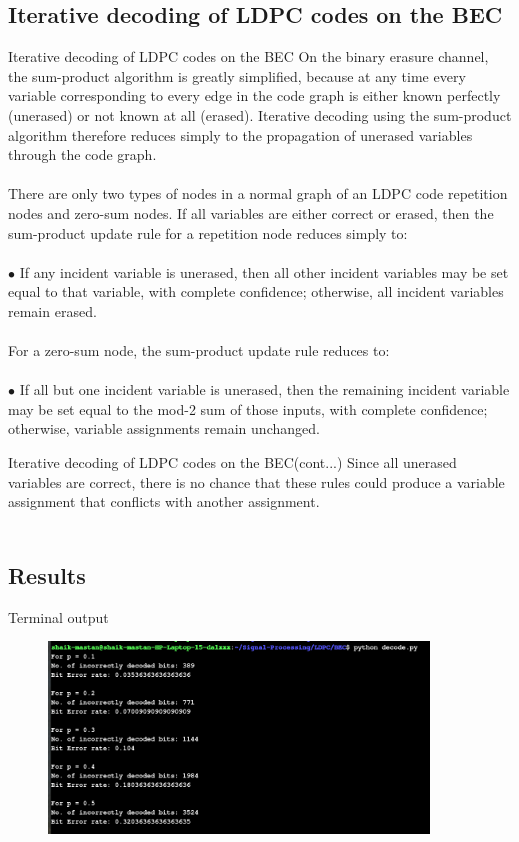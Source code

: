 \subsection{Iterative decoding of LDPC codes on the BEC}
\begin{frame}{Iterative decoding of LDPC codes on the BEC}
\;\;\;\;\;\;On the binary erasure channel, the sum-product algorithm is greatly simplified, because at any
time every variable corresponding to every edge in the code graph is either known perfectly
(unerased) or not known at all (erased). Iterative decoding using the sum-product algorithm
therefore reduces simply to the propagation of unerased variables through the code graph.\\~\\
\;\;\;\;\;\;There are only two types of nodes in a normal graph of an LDPC code repetition nodes and zero-sum nodes. If all variables are either correct or erased, then the
sum-product update rule for a repetition node reduces simply to:\\~\\
\;\;\;\;\;\;$\bullet$ If any incident variable is unerased, then all other incident variables may be set equal to that variable, with complete confidence; otherwise, all incident variables remain erased.\\~\\
For a zero-sum node, the sum-product update rule reduces to:\\~\\
\;\;\;\;\;\;$\bullet$ If all but one incident variable is unerased, then the remaining incident variable may
be set equal to the mod-2 sum of those inputs, with complete confidence; otherwise,
variable assignments remain unchanged.
\end{frame}
\begin{frame}{Iterative decoding of LDPC codes on the BEC(cont...)}
  Since all unerased variables are correct, there is no chance that these rules could produce a
variable assignment that conflicts with another assignment.\\~\\

\subsection{Results}
\begin{alertblock}{Terminal output}
   \begin{figure}
       \includegraphics[width = 0.9\textwidth]{BEC/terminalBEC.png}
   \end{figure}
\end{alertblock}
\end{frame}

